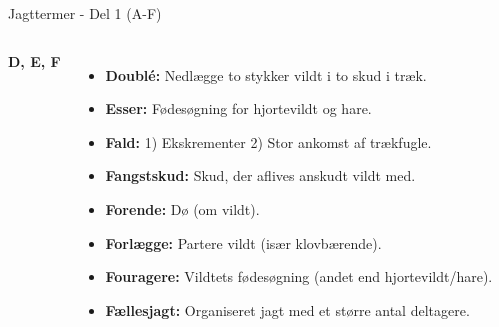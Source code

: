\begin{frame}{Jagttermer - Del 1 (A-F)}
\begin{columns}[T]
    \textbf{\large D, E, F}
    \setlength{\parskip}{0.1em} %
    \scriptsize %
    \RaggedRight
    \begin{itemize}
        \item \textbf{Doublé:} Nedlægge to stykker vildt i to skud i træk.
        \item \textbf{Esser:} Fødesøgning for hjortevildt og hare.
        \item \textbf{Fald:} 1) Ekskrementer 2) Stor ankomst af trækfugle.
        \item \textbf{Fangstskud:} Skud, der aflives anskudt vildt med.
        \item \textbf{Forende:} Dø (om vildt).
        \item \textbf{Forlægge:} Partere vildt (især klovbærende).
        \item \textbf{Fouragere:} Vildtets fødesøgning (andet end hjortevildt/hare).
        \item \textbf{Fællesjagt:} Organiseret jagt med et større antal deltagere.
    \end{itemize}
\end{columns}

\end{frame}
